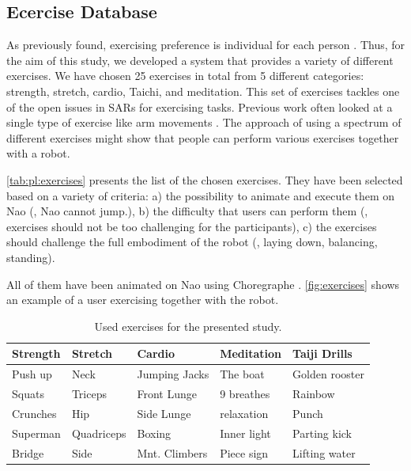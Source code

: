 \subsection{Ecercise Database}
As previously found, exercising preference is individual for each person \cite{rhodes2006personality}. Thus, for the aim of this study, we developed a system that provides a variety of different exercises. We have chosen 25 exercises in total from 5 different categories: strength, stretch, cardio, Taichi, and meditation. This set of exercises tackles one of the open issues in SARs for exercising tasks.
Previous work often looked at a single type of exercise like arm movements \cite{eriksson2005hands,fasola2013socially,guneysu2017}. The approach of using a spectrum of different exercises might show that people can perform various exercises together with a robot.


\autoref{tab:pl:exercises} presents the list of the chosen exercises. They have been selected based on a variety of criteria: a) the possibility to animate and execute them on Nao (\ie{}, Nao cannot jump.), b) the difficulty that users can perform them (\ie{}, exercises should not be too challenging for the participants), c) the exercises should challenge the full embodiment of the robot (\ie{}, laying down, balancing, standing).

 All of them have been animated on Nao using Choregraphe \cite{gouaillier2008nao,pot2009choregraphe}. \autoref{fig:exercises} shows an example of a user exercising together with the robot.
 
 
\begin{table}[t!]
\begin{center}

\caption{Used exercises for the presented study.}\label{tab:pl:exercises}
\begin{tabular}{@{} *5l @{}}    \toprule
Strength  & Stretch & Cardio & Meditation & Taiji Drills \\ \midrule
  Push up & Neck    & Jumping Jacks & The boat & Golden rooster \\
Squats & Triceps & Front Lunge & 9 breathes & Rainbow\\
 Crunches & Hip  & Side Lunge & relaxation & Punch\\
 Superman & Quadriceps & Boxing & Inner light & Parting kick\\
 Bridge & Side  & Mnt. Climbers & Piece sign & Lifting water\\\bottomrule
\end{tabular}
\end{center}
\end{table}

